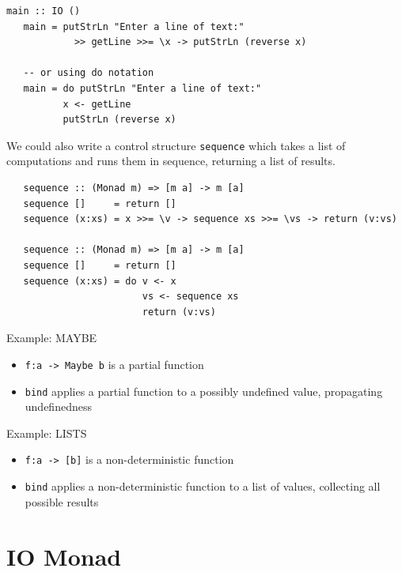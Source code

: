 \begin{lstlisting}[caption={Example of a simple IO computation}]
   main :: IO ()
   main = putStrLn "Enter a line of text:"
            >> getLine >>= \x -> putStrLn (reverse x)
   
   -- or using do notation
   main = do putStrLn "Enter a line of text:"
          x <- getLine
          putStrLn (reverse x)
\end{lstlisting}

We could also write a control structure \lstinline|sequence| which takes a list of computations and runs them in sequence, returning a list of results.
\begin{lstlisting}
   sequence :: (Monad m) => [m a] -> m [a]
   sequence []     = return []
   sequence (x:xs) = x >>= \v -> sequence xs >>= \vs -> return (v:vs)

   sequence :: (Monad m) => [m a] -> m [a]
   sequence []     = return []
   sequence (x:xs) = do v <- x
                        vs <- sequence xs
                        return (v:vs)
\end{lstlisting}

Example: MAYBE
\begin{itemize}
	\item \lstinline|f:a -> Maybe b| is a partial function
	\item \lstinline|bind| applies a partial function to a possibly undefined value, propagating undefinedness
\end{itemize}
Example: LISTS
\begin{itemize}
	\item \lstinline|f:a -> [b]| is a non-deterministic function
	\item \lstinline|bind| applies a non-deterministic function to a list of values, collecting all possible results

\end{itemize}
\section{IO Monad}
